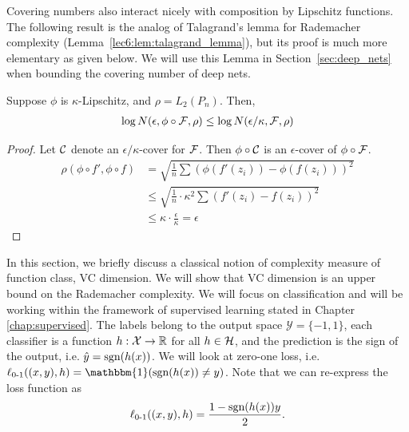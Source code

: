 Covering numbers also interact nicely with composition by Lipschitz functions. The following result is the analog of Talagrand's lemma for Rademacher complexity (Lemma~\ref{lec6:lem:talagrand_lemma}), but its proof is much more elementary as given below. We will use this Lemma in Section~\ref{sec:deep_nets} when bounding the covering number of deep nets. 
\begin{lemma} \label{lec9:lma:talagrand}
	Suppose $\phi$ is $\kappa$-Lipschitz, and $\rho = L_2(P_n)$. Then,
	\begin{align}
	\log N(\epsilon, \phi \circ \mathcal F, \rho) \le \log N(\epsilon / \kappa, \mathcal F, \rho) \label{lec9:eqn:covering-num-lipschitz}
	\end{align}
\end{lemma}
\begin{proof}
	Let $\mathcal C$ denote an $\epsilon/\kappa$-cover for $\mathcal F$. Then $\phi \circ \mathcal C$ is an $\epsilon$-cover of $\phi \circ \mathcal F$.
	\begin{align}
	\rho(\phi \circ f', \phi \circ f) &= \sqrt{\frac{1}{n} \sum (\phi(f'(z_i)) - \phi(f(z_i)))^2} \\ 
	&\le \sqrt{\frac{1}{n} \cdot \kappa^2 \sum(f'(z_i) - f(z_i))^2}\\
	&\le \kappa \cdot \frac{\epsilon}{\kappa} = \epsilon
	\end{align}
\end{proof}

In this section, we briefly discuss a classical notion of complexity measure of function class, VC dimension. We will show that VC dimension is an upper bound on the Rademacher complexity. We will focus on classification and will be working within the framework of supervised learning stated in Chapter \ref{chap:supervised}. The labels belong to the output space $\mathcal{Y} = \{-1, 1\}$, each classifier is a function $h:\mathcal{X}\to\mathbb R$ for all $h \in \mathcal H$, and the prediction is the sign of the output, i.e. $\hat{y} = \text{sgn}(h(x))$. We will look at zero-one loss, i.e. $\err((x,y), h) = \mathbbm{1}(\sgn(h(x))\neq y)$. Note that we can re-express the loss function as
\begin{equation}
\ell_{\textup{0-1}}((x,y), h) = \frac{1-\text{sgn}(h(x))y}{2}.
\end{equation}

